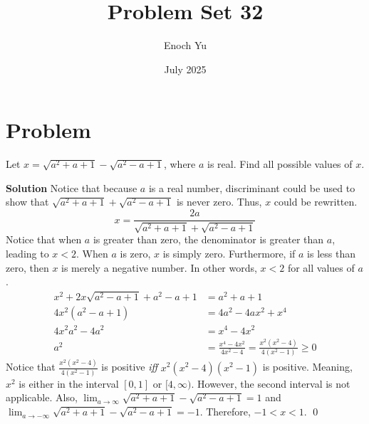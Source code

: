 \documentclass{article}
\title{Problem Set 32}
\author{Enoch Yu}
\date{July 2025}
\newenvironment{solution}{\begin{trivlist}\item[]{\bf Solution}}{\qed \end{trivlist}}
\begin{document}
\section*{Problem}
Let $x = \sqrt{a^2 + a + 1} - \sqrt{a^2 - a + 1}$, where $a$ is real. Find all possible values of $x$.
\begin{solution}
Notice that because $a$ is a real number, discriminant could be used to show that $\sqrt{a^2 + a + 1} + \sqrt{a^2 - a + 1}$ is never zero. Thus, $x$ could be rewritten.
\[
x = \frac{2a}{\sqrt{a^2 + a + 1} + \sqrt{a^2 - a + 1}}
\]
Notice that when $a$ is greater than zero, the denominator is greater than $a$, leading to $x < 2$. When $a$ is zero, $x$ is simply zero. Furthermore, if $a$ is less than zero, then $x$ is merely a negative number. In other words, $x < 2$ for all values of $a$.
\begin{align*}
    x^2 + 2x\sqrt{a^2 - a + 1} + a^2 - a + 1 &= a^2 + a + 1 \\
    4x^2 \left( a^2 - a + 1 \right) &= 4a^2 - 4ax^2 + x^4 \\
    4x^2a^2 - 4a^2 &= x^4 - 4x^2 \\
    a^2 &= \frac{x^4 - 4x^2}{4x^2 - 4} = \frac{x^2(x^2 - 4)}{4(x^2 - 1)} \geq 0
\end{align*}
Notice that $\frac{x^2(x^2 - 4)}{4(x^2 - 1)}$ is positive \textit{iff} $x^2(x^2 - 4)(x^2 - 1)$ is positive. Meaning, $x^2$ is either in the interval $[0, 1]$ or $[4, \infty)$. However, the second interval is not applicable. Also, $\lim_{a\rightarrow\infty}\sqrt{a^2 + a + 1} - \sqrt{a^2 - a + 1} = 1$ and $\lim_{a\rightarrow-\infty}\sqrt{a^2 + a + 1} - \sqrt{a^2 - a + 1} = -1$. Therefore, $\boxed{-1 < x < 1}$.
\end{solution}
\end{document}
